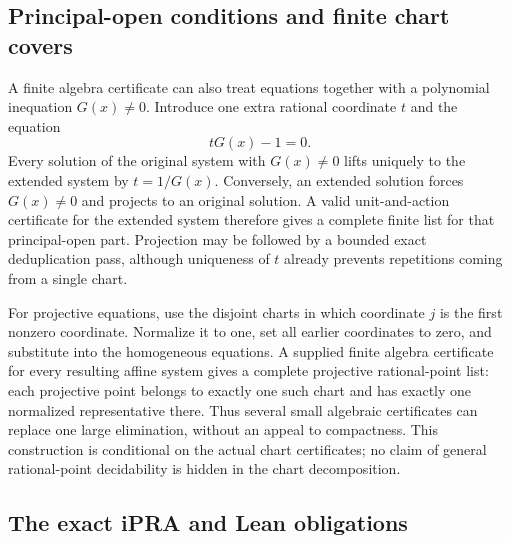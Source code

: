 \subsection{Principal-open conditions and finite chart covers}

A finite algebra certificate can also treat equations together with a
polynomial inequation $G(x)\ne0$.  Introduce one extra rational
coordinate $t$ and the equation
\[
                           tG(x)-1=0.
\]
Every solution of the original system with $G(x)\ne0$ lifts uniquely
to the extended system by $t=1/G(x)$.  Conversely, an extended solution
forces $G(x)\ne0$ and projects to an original solution.  A valid
unit-and-action certificate for the extended system therefore gives
a complete finite list for that principal-open part.  Projection may
be followed by a bounded exact deduplication pass, although uniqueness
of $t$ already prevents repetitions coming from a single chart.

For projective equations, use the disjoint charts in which coordinate
$j$ is the first nonzero coordinate.  Normalize it to one, set all
earlier coordinates to zero, and substitute into the homogeneous
equations.  A supplied finite algebra certificate for every resulting
affine system gives a complete projective rational-point list: each
projective point belongs to exactly one such chart and has exactly one
normalized representative there.  Thus several small algebraic
certificates can replace one large elimination, without an appeal to
compactness.  This construction is conditional on the actual chart
certificates; no claim of general rational-point decidability is hidden
in the chart decomposition.

\subsection{The exact iPRA and Lean obligations}

